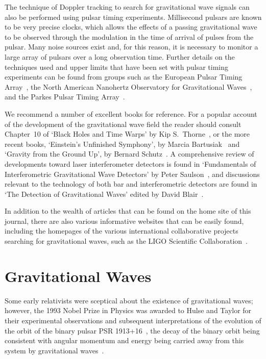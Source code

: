 \documentclass{article}
\begin{document}
The technique of Doppler tracking to search for gravitational wave signals can
also be performed using pulsar timing experiments.  Millisecond pulsars
\cite{Lorimer:2008} are known to be very precise clocks, which allows the
effects of a passing gravitational wave to be observed through the modulation in
the time of arrival of pulses from the pulsar.  Many noise sources exist and,
for this reason, it is necessary to monitor a large array of pulsars over a long
observation time.  Further details on the techniques used and upper limits that
have been set with pulsar timing experiments can be found from groups such as
the European Pulsar Timing Array~\cite{Janssen:2008}, the North American
Nanohertz Observatory for Gravitational Waves~\cite{Jenet:2006,Jenet:2009}, and
the Parkes Pulsar Timing Array~\cite{Hobbs:2008}.

We recommend a number of excellent books for reference. For a popular account of
the development of the gravitational wave field the reader should consult
Chapter~10 of `Black Holes and Time Warps' by Kip S.\ Thorne~\cite{Thorne}, or
the more recent books, `Einstein's Unfinished Symphony', by Marcia
Bartusiak~\cite{Bartusiak:2003} and `Gravity from the Ground Up', by Bernard
Schutz~\cite{Schutz:2003}. A comprehensive review of developments toward laser
interferometer detectors is found in `Fundamentals of Interferometric
Gravitational Wave Detectors' by Peter Saulson~\cite{Saulsonbook}, and
discussions relevant to the technology of both bar and interferometric detectors
are found in `The Detection of Gravitational Waves' edited by David
Blair~\cite{Blair}.

In addition to the wealth of articles that can be found on the home site of
this journal, there are also various informative websites that can be easily
found, including the homepages of the various international collaborative
projects searching for gravitational waves, such as the LIGO Scientific
Collaboration~\cite{LSCweb}.

\newpage


\section{Gravitational Waves}
\label{section:gravwaves}

Some early relativists were sceptical about the existence of gravitational
waves; however, the 1993 Nobel Prize in Physics was awarded to Hulse and Taylor
for their experimental observations and subsequent interpretations of the
evolution of the orbit of the binary pulsar PSR 1913+16~\cite{Hulse, Taylor},
the decay of the binary orbit being consistent with angular momentum and energy
being carried away from this system by gravitational waves~\cite{Will}.
\end{document}
